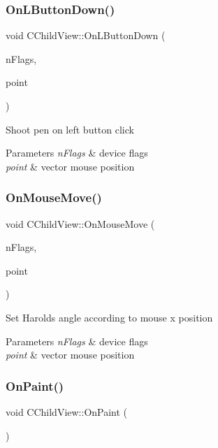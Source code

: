 \subsubsection{\texorpdfstring{OnLButtonDown()}{OnLButtonDown()}}
{\footnotesize\ttfamily void C\+Child\+View\+::\+On\+L\+Button\+Down (\begin{DoxyParamCaption}\item[{U\+I\+NT}]{n\+Flags,  }\item[{C\+Point}]{point }\end{DoxyParamCaption})}

Shoot pen on left button click


\begin{DoxyParams}{Parameters}
{\em n\+Flags} & device flags \\
\hline
{\em point} & vector mouse position \\
\hline
\end{DoxyParams}
\mbox{\label{class_c_child_view_ad3cb2f8d9fa9a6fb06989513dee5a8bc}} 
\subsubsection{\texorpdfstring{OnMouseMove()}{OnMouseMove()}}
{\footnotesize\ttfamily void C\+Child\+View\+::\+On\+Mouse\+Move (\begin{DoxyParamCaption}\item[{U\+I\+NT}]{n\+Flags,  }\item[{C\+Point}]{point }\end{DoxyParamCaption})}

Set Harold\textquotesingle{}s angle according to mouse x position


\begin{DoxyParams}{Parameters}
{\em n\+Flags} & device flags \\
\hline
{\em point} & vector mouse position \\
\hline
\end{DoxyParams}
\mbox{\label{class_c_child_view_a8ea6d42631a4f9f446923ff864b239ab}} 
\subsubsection{\texorpdfstring{OnPaint()}{OnPaint()}}
{\footnotesize\ttfamily void C\+Child\+View\+::\+On\+Paint (\begin{DoxyParamCaption}{ }\end{DoxyParamCaption})\hspace{0.3cm}{\ttfamily [protected]}}

